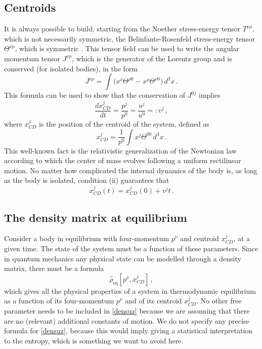 \documentclass[twocolumn,usenatbib]{mnras2}
\begin{document}
\subsection{Centroids}

It is always possible to build, starting from the Noether stress-energy tensor $T^{\nu \rho}$, which is not necessarily symmetric, the Belinfante-Rosenfeld stress-energy tensor $\Theta^{\nu \rho}$, which is symmetric \citep{Weinberg_QFT_1995}. This tensor field can be used to write the angular momentum tensor $J^{\nu \rho}$, which is the generator of the Lorentz group and is conserved (for isolated bodies), in the form 
\begin{equation}
    J^{\nu \rho} = \int \big( x^\nu \Theta^{\rho 0} - x^\rho \Theta^{\nu 0} \big) \, d^3 x \, .
\end{equation}
This formula can be used to show that the conservation of $J^{0j}$ implies \citep{MTW_book}
\begin{equation}
    \dfrac{dx_{CD}^j}{dt} = \dfrac{p^j}{p^0} = \dfrac{u^j}{u^0} =: v^j \, ,
\end{equation}
where $x_{CD}^j$ is the position of the centroid of the system, defined as
\begin{equation}
    x_{CD}^j = \dfrac{1}{p^0} \int x^j \Theta^{00} \, d^3 x \, .
\end{equation}
This well-known fact is the relativistic generalization of the Newtonian law according to which the center of mass evolves following a uniform rectilinear motion. No matter how complicated the internal dynamics of the body is, as long as the body is isolated, condition (ii) guarantees that
\begin{equation}\label{IlCentroide}
    x_{CD}^j(t) = x_{CD}^j(0) +v^j t \, . 
\end{equation}

\subsection{The density matrix at equilibrium}

Consider a body in equilibrium with four-momentum $p^\nu$ and centroid $x_{CD}^j$, at a given time. The state of the system must be a function of these parameters. 
Since in quantum mechanics any physical state can be modelled through a density matrix, there must be a formula
\begin{equation}\label{densuz}
    \hat{\rho}_{\text{eq}}[p^\nu , x_{CD}^j] \, ,
\end{equation}
which gives all the physical properties of a system in thermodynamic equilibrium as a function of its four-momentum $p^\nu$ and of its centroid $x_{CD}^j$. No other free parameter needs to be included in \eqref{densuz} because we are assuming that there are no (relevant) additional constants of motion. We do not specify any precise formula for \eqref{densuz}, because this would imply giving a statistical interpretation to the entropy, which is something we want to avoid here. 
\end{document}
